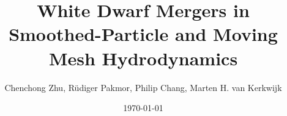 \documentclass[iop]{emulateapj}
\begin{document}
\title{White Dwarf Mergers in Smoothed-Particle and Moving Mesh Hydrodynamics}

\author{Chenchong Zhu, R\"{u}diger Pakmor, Philip Chang, Marten H. van Kerkwijk}

\date{\today}



\maketitle









\end{document}
